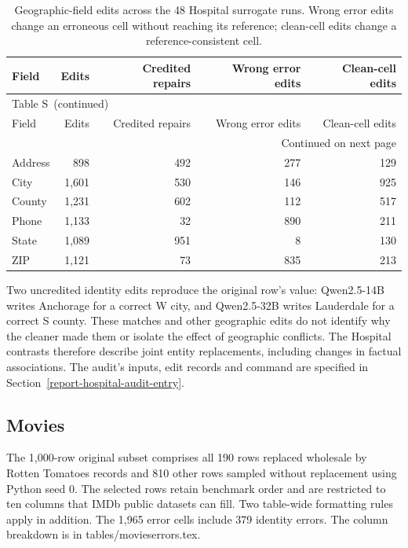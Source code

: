 \documentclass[10pt,a4paper]{article}
\renewcommand{\thetable}{S\arabic{table}}
\begin{document}
\begingroup\small\setlength{\tabcolsep}{5pt}
\begin{longtable}{@{}lrrrr@{}}
\caption{Geographic-field edits across the 48 Hospital surrogate runs. Wrong error edits
change an erroneous cell without reaching its reference; clean-cell edits change a reference-consistent cell.}
\label{report-hospital-geography}\\
\toprule
Field & Edits & Credited repairs & Wrong error edits & Clean-cell edits \\
\midrule
\endfirsthead
\multicolumn{5}{l}{\small Table \thetable\ (continued)}\\
\toprule
Field & Edits & Credited repairs & Wrong error edits & Clean-cell edits \\
\midrule
\endhead
\midrule\multicolumn{5}{r}{\footnotesize Continued on next page}\\\endfoot
\bottomrule\endlastfoot
Address & 898 & 492 & 277 & 129 \\
City & 1,601 & 530 & 146 & 925 \\
County & 1,231 & 602 & 112 & 517 \\
Phone & 1,133 & 32 & 890 & 211 \\
State & 1,089 & 951 & 8 & 130 \\
ZIP & 1,121 & 73 & 835 & 213 \\
\end{longtable}\endgroup

Two uncredited identity edits reproduce the original row's value: Qwen2.5-14B writes
{\ttfamily Anchorage} for a correct W city, and Qwen2.5-32B writes {\ttfamily Lauderdale}
for a correct S county. These matches and other geographic edits do not identify why the
cleaner made them or isolate the effect of geographic conflicts. The Hospital contrasts
therefore describe joint entity replacements, including changes in factual associations.
The audit's inputs, edit records and command are specified in Section~\ref{report-hospital-audit-entry}.

\subsection{Movies}

The 1,000-row original subset comprises all 190 rows replaced wholesale by Rotten Tomatoes records and 810 other rows sampled without replacement using Python seed 0. The selected rows retain benchmark order and are restricted to ten columns that IMDb public datasets can fill. Two table-wide formatting rules apply in addition. The 1,965 error cells include 379 identity errors. The column breakdown is in {\ttfamily\small tables/\allowbreak{}movieserrors.tex}.
\end{document}
